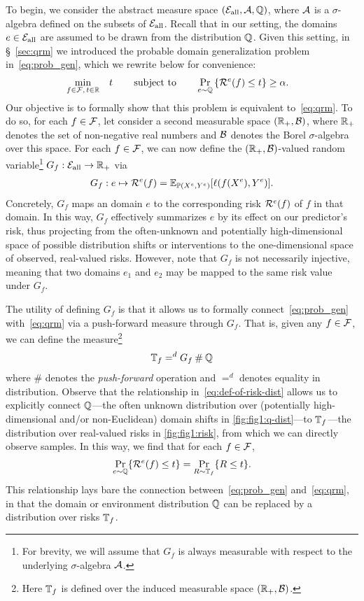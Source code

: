 \documentclass{article}
\begin{document}
To begin, we consider the abstract measure space $({\mathcal{E}_\text{all}}, \mathcal{A}, \mathbb{Q})$, where $\mathcal{A}$ is a $\sigma$-algebra defined on the subsets of ${\mathcal{E}_\text{all}}$.  Recall that in our setting, the domains $e\in{\mathcal{E}_\text{all}}$ are assumed to be drawn from the distribution $\mathbb{Q}$.  Given this setting, in \S~\ref{sec:qrm} we introduced the probable domain generalization problem in~\eqref{eq:prob_gen}, which we rewrite below for convenience:
%
\begin{alignat}{2}
    &\min_{f\in\mathcal{F},\, t \in \mathbb{R}} &&t  \qquad \operatorname*{subject\,\, to \qquad} \Pr_{e\sim\mathbb{Q}} \left\{\mathcal{R}^e(f) \leq t \right\} \geq \alpha.
\end{alignat}
%
Our objective is to formally show that this problem is equivalent to~\eqref{eq:qrm}.  To do so, for each $f\in\mathcal{F}$, let consider a second measurable space $(\mathbb{R}_+, \mathcal{B})$, where $\mathbb{R}_+$ denotes the set of non-negative real numbers and $\mathcal{B}$ denotes the Borel $\sigma$-algebra over this space.  For each $f\in\mathcal{F}$, we can now define the $(\mathbb{R}_+, \mathcal{B})$-valued random variable\footnote{For brevity, we will assume that $G_f$ is always measurable with respect to the underlying $\sigma$-algebra $\mathcal{A}$.} $G_f:{\mathcal{E}_\text{all}}\to\mathbb{R}_+$ via
%
\begin{align}
    G_f : e \mapsto \mathcal{R}^e(f) = \operatorname{\mathbb{E}}_{\mathbb{P}(X^e,Y^e)}[\ell(f(X^e),Y^e)].
\end{align}
%
Concretely, $G_f$ maps an domain $e$ to the corresponding risk $\mathcal{R}^e(f)$ of $f$ in that domain.  In this way, $G_f$ effectively summarizes $e$ by its effect on our predictor's risk, thus projecting from the often-unknown and potentially high-dimensional space of possible distribution shifts or interventions to the one-dimensional space of observed, real-valued risks.  However, note that $G_f$ is not necessarily injective, meaning that two domains $e_1$ and $e_2$ may be mapped to the same risk value under $G_f$.

The utility of defining $G_f$ is that it allows us to formally connect~\eqref{eq:prob_gen} with~\eqref{eq:qrm} via a push-forward measure through $G_f$.  That is, given any $f\in\mathcal{F}$, we can define the measure\footnote{Here $\mathbb{T}_f$ is defined over the induced measurable space $(\mathbb{R}_+, \mathcal{B})$.}
%
\begin{align}
    \mathbb{T}_f =^d G_f\:\#\: \mathbb{Q} \label{eq:def-of-risk-dist}
\end{align}
%
where $\#$ denotes the \emph{push-forward} operation and $=^d$ denotes equality in distribution.  Observe that the relationship in~\eqref{eq:def-of-risk-dist} allows us to explicitly connect $\mathbb{Q}$---the often unknown distribution over (potentially high-dimensional and/or non-Euclidean) domain shifts in \cref{fig:fig1:q-dist}---to $\mathbb{T}_f$---the distribution over real-valued risks in \cref{fig:fig1:risk}, from which we can directly observe samples.  In this way, we find that for each $f\in\mathcal{F}$,
%
\begin{align}
    \Pr_{e\sim\mathbb{Q}} \{\mathcal{R}^e(f) \leq t \} = \Pr_{R\sim\mathbb{T}_f} \{R \leq t\}.
\end{align}
%
This relationship lays bare the connection between~\eqref{eq:prob_gen} and~\eqref{eq:qrm}, in that the domain or environment distribution $\mathbb{Q}$ can be replaced by a distribution over risks $\mathbb{T}_f$.
\end{document}
